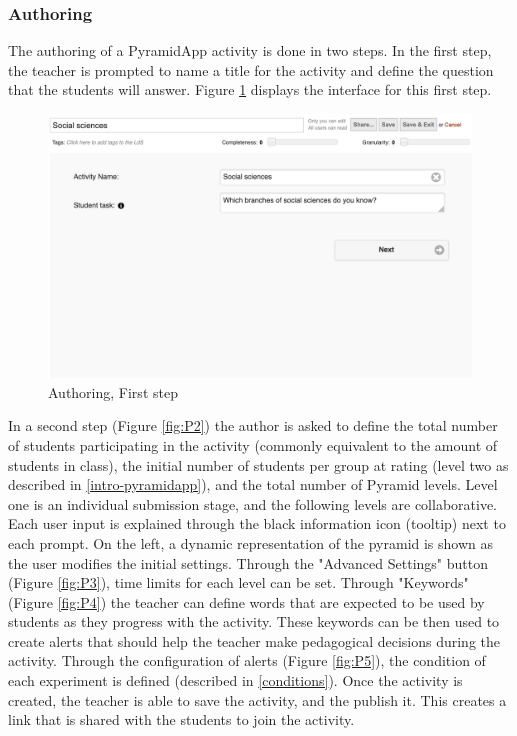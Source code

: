 \subsubsection{Authoring}
The authoring of a PyramidApp activity is done in two steps. In the first step, the teacher is prompted to name a title for the activity and define the question that the students will answer. Figure \ref{fig:P1} displays the interface for this first step.
\begin{figure}[!h]
    \includegraphics[clip,width=\columnwidth]{Figures/pyramidapp1.png}%
\caption{Authoring, First step}
\label{fig:P1}
\end{figure}
In a second step (Figure \ref{fig:P2}) the author is asked to define the total number of students participating in the activity (commonly equivalent to the amount of students in class), the initial number of students per group at rating (level two as described in \ref{intro-pyramidapp}), and the total number of Pyramid levels. Level one is an individual submission stage, and the following levels are collaborative. Each user input is explained through the black information icon (tooltip) next to each prompt. On the left, a dynamic representation of the pyramid is shown as the user modifies the initial settings. Through the "Advanced Settings" button (Figure \ref{fig:P3}), time limits for each level can be set. Through "Keywords" (Figure \ref{fig:P4}) the teacher can define words that are expected to be used by students as they progress with the activity. These keywords can be then used to create alerts that should help the teacher make pedagogical decisions during the activity. Through the configuration of alerts (Figure \ref{fig:P5}), the condition of each experiment is defined (described in \ref{conditions}). Once the activity is created, the teacher is able to save the activity, and the publish it. This creates a link that is shared with the students to join the activity.
